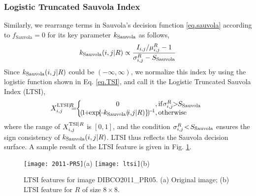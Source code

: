 \documentclass[onecolumn,11pt,draftcls,journal]{IEEEtran}
\def\fwI{.25}
\begin{document}
\subsubsection{ Logistic Truncated Sauvola Index}
Similarly, we rearrange terms in Sauvola's decision function \eqref{eq.sauvola} according to $f_{\textrm{Sauvola}}=0$ for its key parameter $k_{\rm{Sauvola}}$ as follows,
\begin{equation}
k_{\rm{Sauvola}}(i,j|R) \propto \displaystyle{I_{i,j}/\mu_{i,j}^R-1\over \sigma_{i,j}^{R}-S_{\rm{Sauvola}}}
\end{equation} 
Since $k_{\rm{Sauvola}}(i,j|R)$ could be $(-\infty,\infty)$, we normalize this index by using the logistic function shown in Eq. \eqref{eq.TSI}, and call it the Logistic Truncated Sauvola Index (LTSI),
\begin{equation}
X_{i,j}^{{\rm{LTSI}}|\!R} \!\!\!\!=\!\!
\left\{\!\!\!\!
\begin{array}{c@{}l}
0&,{\rm if} \sigma_{i,j}^{R}\!\!>\!\!S_{\rm{Sauvola}}\\
( \!1\!\!+\!\!\exp\!\{\!-\!\!k_{\rm{Sauvola}}(\!i,\!j|R)\}\!)\!^{\tiny{-\!1}}&,\rm otherwise
\end{array}
\right.
\label{eq.TSI}
\end{equation}
where the range of $X_{i,j}^{{\rm{TSI}}|R}$ is $[0\!,\!1]$, and the condition $\sigma_{i,j}^{R}\!<\!S_{\rm{Sauvola}}$ ensures the sign consistency of $k_{\rm{Sauvola}}(i,j|R)$. LTSI thus reflects the Sauvola decision surface. A sample result of the LTSI feature is given in Fig. \ref{fig.ltsi}.

\begin{figure}[!h]
\centering\scriptsize
\texttt{[image: 2011-PR5]}{(a)}
\texttt{[image: ltsi]}{(b)}
\caption{LTSI features for image DIBCO2011\_PR05. (a) Original image; (b) LTSI feature for $R$ of size $8\times 8$. }\label{fig.ltsi}
\end{figure}
\end{document}
